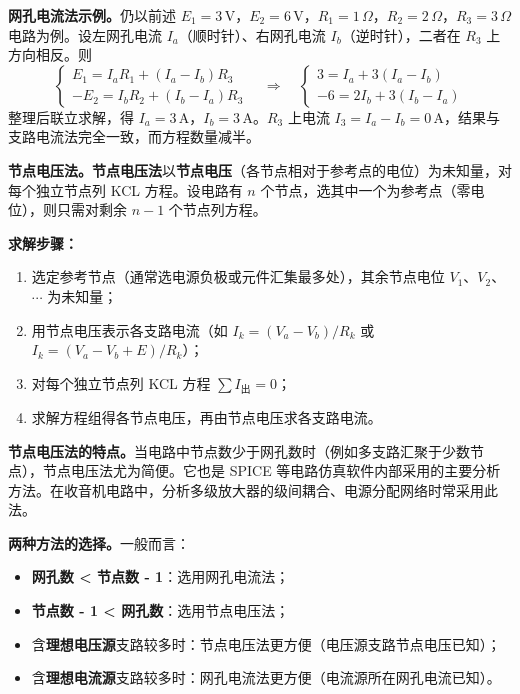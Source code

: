 \documentclass[12pt,UTF8]{ctexbook}
\begin{document}
\textbf{网孔电流法示例。}仍以前述 $E_1=3\,\mathrm{V}$，$E_2=6\,\mathrm{V}$，$R_1=1\,\Omega$，$R_2=2\,\Omega$，$R_3=3\,\Omega$ 电路为例。设左网孔电流 $I_a$（顺时针）、右网孔电流 $I_b$（逆时针），二者在 $R_3$ 上方向相反。则
\[
\begin{cases}
E_1 = I_a R_1 + (I_a - I_b) R_3 \\
-E_2 = I_b R_2 + (I_b - I_a) R_3
\end{cases}
\quad\Rightarrow\quad
\begin{cases}
3 = I_a + 3(I_a - I_b) \\
-6 = 2 I_b + 3(I_b - I_a)
\end{cases}
\]
整理后联立求解，得 $I_a = 3\,\mathrm{A}$，$I_b = 3\,\mathrm{A}$。$R_3$ 上电流 $I_3 = I_a - I_b = 0\,\mathrm{A}$，结果与支路电流法完全一致，而方程数量减半。

\textbf{节点电压法。}\textbf{节点电压法}以\textbf{节点电压}（各节点相对于参考点的电位）为未知量，对每个独立节点列 KCL 方程。设电路有 $n$ 个节点，选其中一个为参考点（零电位），则只需对剩余 $n-1$ 个节点列方程。

\textbf{求解步骤：}
\begin{enumerate}
  \item 选定参考节点（通常选电源负极或元件汇集最多处），其余节点电位 $V_1$、$V_2$、$\cdots$ 为未知量；
  \item 用节点电压表示各支路电流（如 $I_k = (V_a - V_b)/R_k$ 或 $I_k = (V_a - V_b + E)/R_k$）；
  \item 对每个独立节点列 KCL 方程 $\sum I_{\text{出}} = 0$；
  \item 求解方程组得各节点电压，再由节点电压求各支路电流。
\end{enumerate}

\textbf{节点电压法的特点。}当电路中节点数少于网孔数时（例如多支路汇聚于少数节点），节点电压法尤为简便。它也是 SPICE 等电路仿真软件内部采用的主要分析方法。在收音机电路中，分析多级放大器的级间耦合、电源分配网络时常采用此法。

\textbf{两种方法的选择。}一般而言：
\begin{itemize}
  \item \textbf{网孔数 < 节点数 - 1}：选用网孔电流法；
  \item \textbf{节点数 - 1 < 网孔数}：选用节点电压法；
  \item 含\textbf{理想电压源}支路较多时：节点电压法更方便（电压源支路节点电压已知）；
  \item 含\textbf{理想电流源}支路较多时：网孔电流法更方便（电流源所在网孔电流已知）。
\end{itemize}
\end{document}
